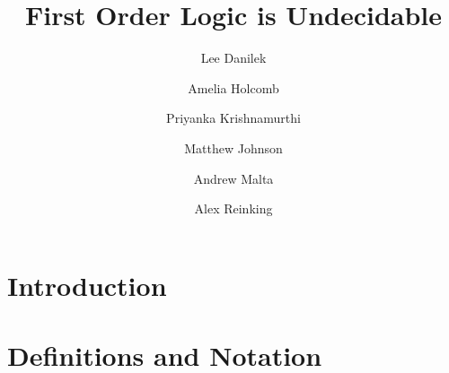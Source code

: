 \documentclass{article}
\title{First Order Logic is Undecidable}
\author{Lee Danilek \and Amelia Holcomb \and Priyanka Krishnamurthi \and Matthew Johnson \and Andrew Malta \and Alex Reinking}
\theoremstyle{definition}
\theoremstyle{definition}
\begin{document}
\maketitle

\section{Introduction}


\section{Definitions and Notation}

\end{document}
